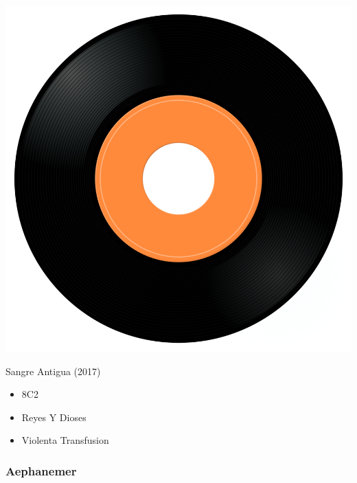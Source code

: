 \begin{minipage}[t]{0.25\textwidth}\vspace{0pt}
\captionsetup{type=figure}
\includegraphics[width=\textwidth]{Images/cover.png}
\caption*{Sangre Antigua (2017)}
\end{minipage}
\begin{minipage}[t]{0.25\textwidth}\vspace{0pt}
\begin{itemize}[nosep,leftmargin=1em,labelwidth=*,align=left]
	\setlength{\itemsep}{0pt}
	\item 8C2
	\item Reyes Y Dioses
	\item Violenta Transfusion
\end{itemize}
\end{minipage}

\subsubsection{Aephanemer}

